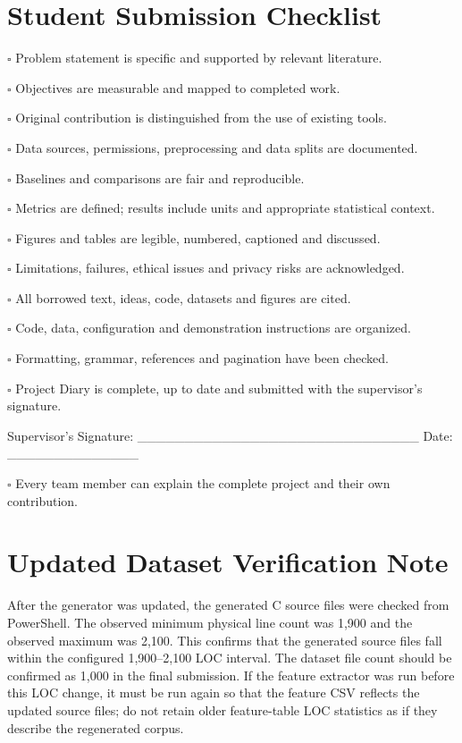 \documentclass[12pt,a4paper,oneside]{report}
\begin{document}
\chapter*{Student Submission Checklist}
\noindent $\square$ Problem statement is specific and supported by relevant literature.\par
\noindent $\square$ Objectives are measurable and mapped to completed work.\par
\noindent $\square$ Original contribution is distinguished from the use of existing tools.\par
\noindent $\square$ Data sources, permissions, preprocessing and data splits are documented.\par
\noindent $\square$ Baselines and comparisons are fair and reproducible.\par
\noindent $\square$ Metrics are defined; results include units and appropriate statistical context.\par
\noindent $\square$ Figures and tables are legible, numbered, captioned and discussed.\par
\noindent $\square$ Limitations, failures, ethical issues and privacy risks are acknowledged.\par
\noindent $\square$ All borrowed text, ideas, code, datasets and figures are cited.\par
\noindent $\square$ Code, data, configuration and demonstration instructions are organized.\par
\noindent $\square$ Formatting, grammar, references and pagination have been checked.\par
\noindent $\square$ Project Diary is complete, up to date and submitted with the supervisor's signature.\par
Supervisor's Signature: \_\_\_\_\_\_\_\_\_\_\_\_\_\_\_\_\_\_\_\_\_\_\_\_\_\_\_\_\_\_    Date: \_\_\_\_\_\_\_\_\_\_\_\_\_\_\par
\noindent $\square$ Every team member can explain the complete project and their own contribution.\par

\chapter*{Updated Dataset Verification Note}
After the generator was updated, the generated C source files were checked from PowerShell. The observed minimum physical line count was 1,900 and the observed maximum was 2,100. This confirms that the generated source files fall within the configured 1,900--2,100 LOC interval. The dataset file count should be confirmed as 1,000 in the final submission. If the feature extractor was run before this LOC change, it must be run again so that the feature CSV reflects the updated source files; do not retain older feature-table LOC statistics as if they describe the regenerated corpus.
\end{document}
